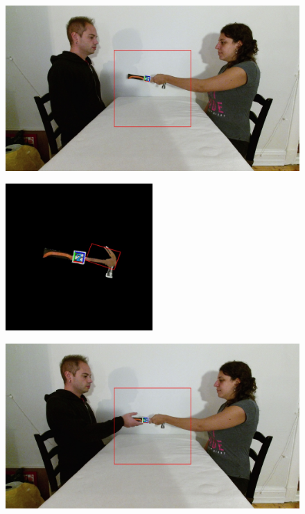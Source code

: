 \begin{figure}
	\centering
	\includegraphics[width=\textwidth]{img/methods/handovers/hammer_frame.jpg}
	\caption{}
	\label{fig:handover_hammer}
\end{figure}

\begin{figure}
	\centering
	\includegraphics[width=0.5\textwidth]{img/methods/handovers/hammer_masked.jpg}
	\caption{}
	\label{fig:handover_hammer_masked}
\end{figure}

\begin{figure}
	\centering
	\includegraphics[width=\textwidth]{img/methods/handovers/incorr_frame.jpg}
	\caption{}
	\label{fig:handover_incorr}
\end{figure}


